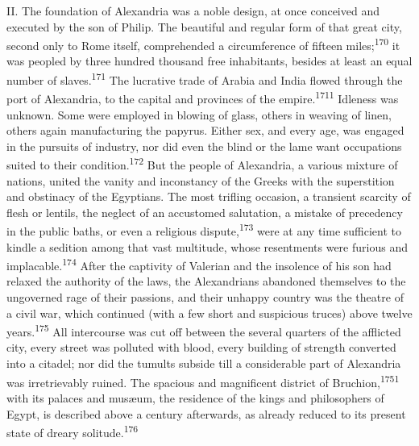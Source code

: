 II. The foundation of Alexandria was a noble design, at once
conceived and executed by the son of Philip. The beautiful and
regular form of that great city, second only to Rome itself,
comprehended a circumference of fifteen miles;\textsuperscript{170} it was peopled
by three hundred thousand free inhabitants, besides at least an
equal number of slaves.\textsuperscript{171} The lucrative trade of Arabia and
India flowed through the port of Alexandria, to the capital and
provinces of the empire.\textsuperscript{1711} Idleness was unknown. Some were
employed in blowing of glass, others in weaving of linen, others
again manufacturing the papyrus. Either sex, and every age, was
engaged in the pursuits of industry, nor did even the blind or
the lame want occupations suited to their condition.\textsuperscript{172} But the
people of Alexandria, a various mixture of nations, united the
vanity and inconstancy of the Greeks with the superstition and
obstinacy of the Egyptians. The most trifling occasion, a
transient scarcity of flesh or lentils, the neglect of an
accustomed salutation, a mistake of precedency in the public
baths, or even a religious dispute,\textsuperscript{173} were at any time
sufficient to kindle a sedition among that vast multitude, whose
resentments were furious and implacable.\textsuperscript{174} After the captivity
of Valerian and the insolence of his son had relaxed the
authority of the laws, the Alexandrians abandoned themselves to
the ungoverned rage of their passions, and their unhappy country
was the theatre of a civil war, which continued (with a few short
and suspicious truces) above twelve years.\textsuperscript{175} All intercourse
was cut off between the several quarters of the afflicted city,
every street was polluted with blood, every building of strength
converted into a citadel; nor did the tumults subside till a
considerable part of Alexandria was irretrievably ruined. The
spacious and magnificent district of Bruchion,\textsuperscript{1751} with its
palaces and musæum, the residence of the kings and philosophers
of Egypt, is described above a century afterwards, as already
reduced to its present state of dreary solitude.\textsuperscript{176}




